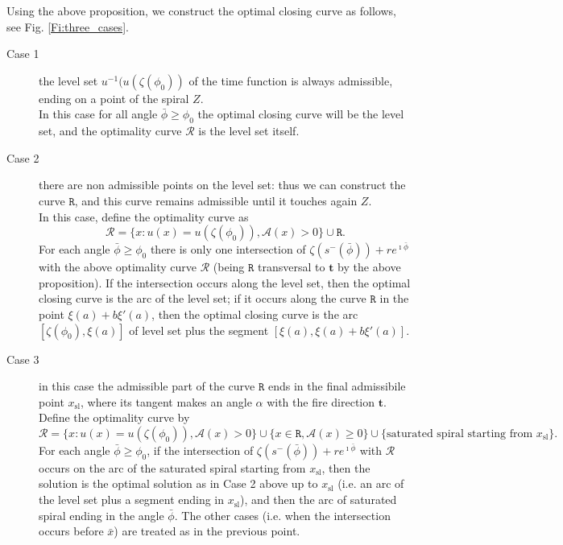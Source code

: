 \documentclass[reqno]{amsart}
\theoremstyle{definition} \newtheorem{definition}{Definition}[section]
\theoremstyle{definition} \newtheorem{remark}[definition]{Remark}
\theoremstyle{plain} \newtheorem{lemma}[definition]{Lemma}
\theoremstyle{plain} \newtheorem{proposition}[definition]{Proposition}
\theoremstyle{plain} \newtheorem{theorem}[definition]{Theorem}
\theoremstyle{plain} \newtheorem{corollary}[definition]{Corollary}
\theoremstyle{definition} \newtheorem{example}[definition]{Example}
\theoremstyle{plain} \newtheorem{claim}[clai]{Claim}
\theoremstyle{definition} \newtheorem{assumption}[definition]{Assumption}
\theoremstyle{definition} \newtheorem{observation}[definition]{Observation}
\newcommand{\1}{\mathbbm 1}
\renewcommand{\i}{\imath}
\numberwithin{equation}{section} %
\theoremstyle{plain} \newtheorem*{theorem*}{Theorem}
\theoremstyle{plain} \newtheorem{mthm}[maintheorem]{Main Theorem}
\theoremstyle{plain} \newtheorem*{mthm*}{Main Theorem}
\theoremstyle{plain} \newtheorem*{conjecture*}{Conjecture}
\theoremstyle{plain} \newtheorem{conjecture}[definition]{Conjecture}
\theoremstyle{plain} \newtheorem*{problem*}{Problem}
\begin{document}
Using the above proposition, we construct the optimal closing curve as follows, see Fig. \ref{Fi:three_cases}.
\begin{description}
\item[Case 1] the level set $u^{-1}(u(\zeta({\phi_0}))$ of the time function is always admissible, ending on a point of the spiral $Z$. \\
In this case for all angle ${\bar \phi} \geq {\phi_0}$ the optimal closing curve will be the level set, and the optimality curve $\mathcal R$ is the level set itself.

\item[Case 2] there are non admissible points on the level set: thus we can construct the curve $\mathtt R$, and this curve remains admissible until it touches again $Z$. \\
In this case, define the optimality curve as
\begin{equation*}
\mathcal R = \big\{ x: u(x) = u(\zeta({\phi_0})), \mathcal A(x) > 0 \big\} \cup \mathtt R.
\end{equation*}
For each angle ${\bar \phi} \geq {\phi_0}$ there is only one intersection of $\zeta(s^-({\bar \phi})) + r e^{\i {\bar \phi}}$ with the above optimality curve $\mathcal R$ (being $\mathtt R$ transversal to $\mathbf t$ by the above proposition). If the intersection occurs along the level set, then the optimal closing curve is the arc of the level set; if it occurs along the curve $\mathtt R$ in the point $\xi(a) + b \xi'(a)$, then the optimal closing curve is the arc $[\zeta(\phi_0),\xi(a)]$ of level set plus the segment $[\xi(a),\xi(a) + b \xi'(a)]$.

\item[Case 3] in this case the admissible part of the curve $\mathtt R$ ends in the final admissibile point $x_\mathrm{sl}$, where its tangent makes an angle $\alpha$ with the fire direction $\mathbf t$. \\
Define the optimality curve by
\begin{equation*}
\mathcal R = \big\{ x: u(x) = u(\zeta({\phi_0})), \mathcal A(x) > 0 \big\} \cup \big\{ x \in \mathtt R, \mathcal A(x) \geq 0 \big\} \cup \big\{ \text{saturated spiral starting from $x_\mathrm{sl}$} \big\}. 
\end{equation*}
For each angle ${\bar \phi} \geq {\phi_0}$, if the intersection of $\zeta(s^-({\bar \phi})) + r e^{\i {\bar \phi}}$ with $\mathcal R$ occurs on the arc of the saturated spiral starting from $x_\mathrm{sl}$, then the solution is the optimal solution as in Case 2 above up to $x_\mathrm{sl}$ (i.e. an arc of the level set plus a segment ending in $x_\mathrm{sl}$), and then the arc of saturated spiral ending in the angle ${\bar \phi}$. The other cases (i.e. when the intersection occurs before $\bar x$) are treated as in the previous point.
\end{description}
\end{document}
